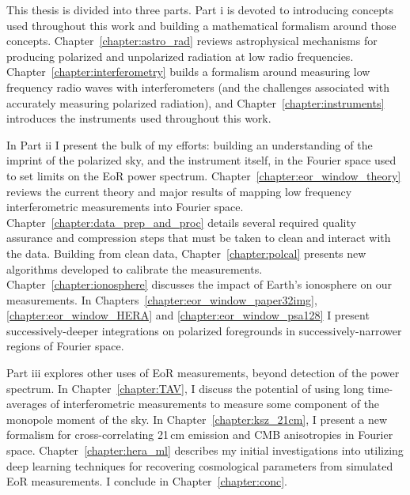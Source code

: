 This thesis is divided into three parts. Part {\sc i} is devoted to introducing concepts used throughout this work and building a mathematical formalism around those concepts. 
Chapter~\ref{chapter:astro_rad} reviews astrophysical mechanisms for producing polarized and unpolarized radiation at low radio frequencies. 
Chapter~\ref{chapter:interferometry} builds a formalism around measuring low frequency radio waves with interferometers (and the challenges associated with accurately measuring polarized radiation), and Chapter~\ref{chapter:instruments} introduces the instruments used throughout this work.

In Part {\sc ii} I present the bulk of my efforts: building an understanding of the imprint of the polarized sky, and the instrument itself, in the Fourier space used to set limits on the EoR power spectrum. 
Chapter~\ref{chapter:eor_window_theory} reviews the current theory and major results of mapping low frequency interferometric measurements into Fourier space. 
Chapter~\ref{chapter:data_prep_and_proc} details several required quality assurance and compression steps that must be taken to clean and interact with the data. Building from clean data, Chapter~\ref{chapter:polcal} presents new algorithms developed to calibrate the measurements.
Chapter~\ref{chapter:ionosphere} discusses the impact of Earth's ionosphere on our measurements.
In Chapters~\ref{chapter:eor_window_paper32img}, \ref{chapter:eor_window_HERA} and \ref{chapter:eor_window_psa128} I present successively-deeper integrations on polarized foregrounds in successively-narrower regions of Fourier space.

Part {\sc iii} explores other uses of EoR measurements, beyond detection of the power spectrum. In Chapter~\ref{chapter:TAV}, I discuss the potential of using long time-averages of interferometric measurements to measure some component of the monopole moment of the sky. In Chapter~\ref{chapter:ksz_21cm}, I present a new formalism for cross-correlating 21\,cm emission and CMB anisotropies in Fourier space. Chapter~\ref{chapter:hera_ml} describes my initial investigations into utilizing deep learning techniques for recovering cosmological parameters from simulated EoR measurements. I conclude in Chapter~\ref{chapter:conc}.
